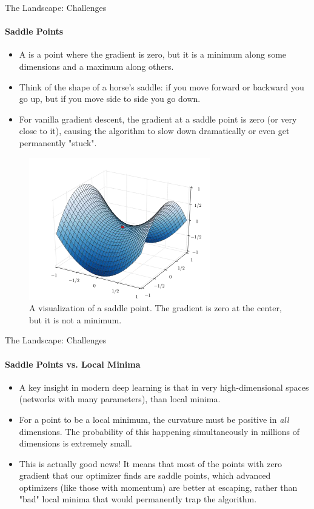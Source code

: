 \begin{frame}{The Landscape: Challenges}
    \framesubtitle{Saddle Points}
    \small
    \begin{itemize}
        \item A  is a point where the gradient is zero, but it is a minimum along some dimensions and a maximum along others.
        \item Think of the shape of a horse's saddle: if you move forward or backward you go up, but if you move side to side you go down.
        \item For vanilla gradient descent, the gradient at a saddle point is zero (or very close to it), causing the algorithm to slow down dramatically or even get permanently "stuck".
    \end{itemize}
    \begin{figure}
        \centering
        \includegraphics[width=0.5\linewidth]{images/saddle_point.png}
        \caption{A visualization of a saddle point. The gradient is zero at the center, but it is not a minimum.}
    \end{figure}
\end{frame}

\begin{frame}{The Landscape: Challenges}
    \framesubtitle{Saddle Points vs. Local Minima}
    \begin{itemize}
        \item A key insight in modern deep learning is that in very high-dimensional spaces (networks with many parameters),  than local minima.
        \item For a point to be a local minimum, the curvature must be positive in \emph{all} dimensions. The probability of this happening simultaneously in millions of dimensions is extremely small.
        \item This is actually good news! It means that most of the points with zero gradient that our optimizer finds are saddle points, which advanced optimizers (like those with momentum) are better at escaping, rather than "bad" local minima that would permanently trap the algorithm.
    \end{itemize}
\end{frame}